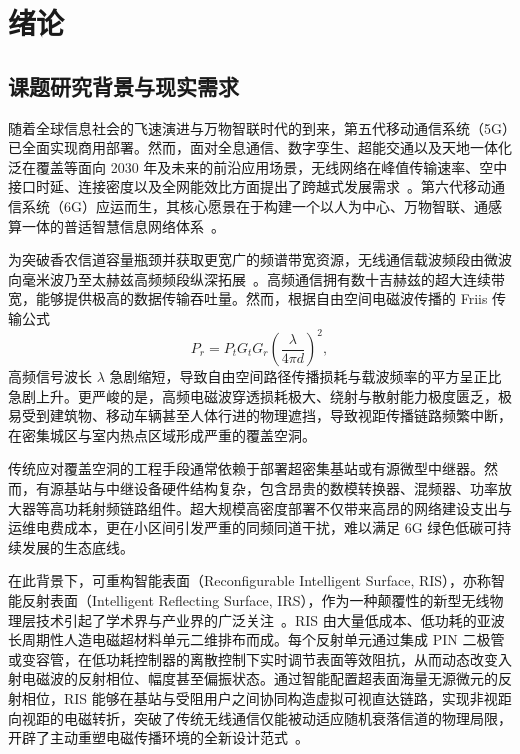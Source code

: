 \chapter{绪\quad 论}
\label{chap:intro}

\section{课题研究背景与现实需求}

随着全球信息社会的飞速演进与万物智联时代的到来，第五代移动通信系统（5G）已全面实现商用部署。然而，面对全息通信、数字孪生、超能交通以及天地一体化泛在覆盖等面向 2030 年及未来的前沿应用场景，无线网络在峰值传输速率、空中接口时延、连接密度以及全网能效比方面提出了跨越式发展需求~\cite{wang2023road}。第六代移动通信系统（6G）应运而生，其核心愿景在于构建一个以人为中心、万物智联、通感算一体的普适智慧信息网络体系~\cite{liu2022integrated}。

为突破香农信道容量瓶颈并获取更宽广的频谱带宽资源，无线通信载波频段由微波向毫米波乃至太赫兹高频频段纵深拓展~\cite{hong2021role}。高频通信拥有数十吉赫兹的超大连续带宽，能够提供极高的数据传输吞吐量。然而，根据自由空间电磁波传播的 Friis 传输公式
\begin{equation}
  P_r = P_t G_t G_r \left( \frac{\lambda}{4\pi d} \right)^{2},
  \label{eq:friis_pathloss}
\end{equation}
高频信号波长 $\lambda$ 急剧缩短，导致自由空间路径传播损耗与载波频率的平方呈正比急剧上升。更严峻的是，高频电磁波穿透损耗极大、绕射与散射能力极度匮乏，极易受到建筑物、移动车辆甚至人体行进的物理遮挡，导致视距传播链路频繁中断，在密集城区与室内热点区域形成严重的覆盖空洞。

传统应对覆盖空洞的工程手段通常依赖于部署超密集基站或有源微型中继器。然而，有源基站与中继设备硬件结构复杂，包含昂贵的数模转换器、混频器、功率放大器等高功耗射频链路组件。超大规模高密度部署不仅带来高昂的网络建设支出与运维电费成本，更在小区间引发严重的同频同道干扰，难以满足 6G 绿色低碳可持续发展的生态底线。

在此背景下，可重构智能表面（Reconfigurable Intelligent Surface, RIS），亦称智能反射表面（Intelligent Reflecting Surface, IRS），作为一种颠覆性的新型无线物理层技术引起了学术界与产业界的广泛关注~\cite{wu2020towards}。RIS 由大量低成本、低功耗的亚波长周期性人造电磁超材料单元二维排布而成。每个反射单元通过集成 PIN 二极管或变容管，在低功耗控制器的离散控制下实时调节表面等效阻抗，从而动态改变入射电磁波的反射相位、幅度甚至偏振状态。通过智能配置超表面海量无源微元的反射相位，RIS 能够在基站与受阻用户之间协同构造虚拟可视直达链路，实现非视距向视距的电磁转折，突破了传统无线通信仅能被动适应随机衰落信道的物理局限，开辟了主动重塑电磁传播环境的全新设计范式~\cite{wu2019intelligent}。

